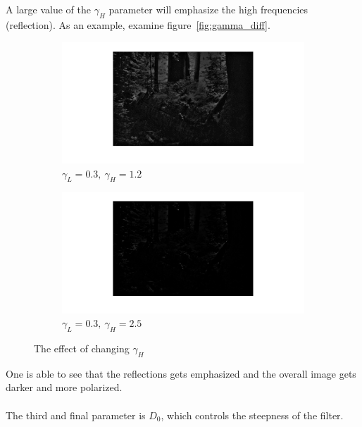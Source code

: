 		\\
		\\
		A large value of the $\gamma_H$ parameter 
		will emphasize the high frequencies (reflection). As an example, 
		examine figure~\ref{fig:gamma_diff}.
		\begin{figure}[h!]
			\centering
			\begin{subfigure}[b]{0.6\textwidth}
				\includegraphics[width=\textwidth]{pics/non_emph_high_frequnces.png}
				\caption{$\gamma_L = 0.3,~\gamma_H = 1.2$}
				\label{fig:high_freq_non_emph}
			\end{subfigure}%
			\begin{subfigure}[b]{0.6\textwidth}
				\includegraphics[width=\textwidth]{pics/emph_high_frequnces.png}
				\caption{$\gamma_L = 0.3,~\gamma_H = 2.5$}
				\label{fig:high_freq_emph}
			\end{subfigure}
			\label{fig:high_gamma}
		\caption{The effect of changing $\gamma_H$}				
		\end{figure}		
		One is able to see that the reflections gets emphasized and the overall
		image gets darker and more polarized.
		\\
		\\
		The third and final parameter is $D_0$, which controls the steepness of the filter.
